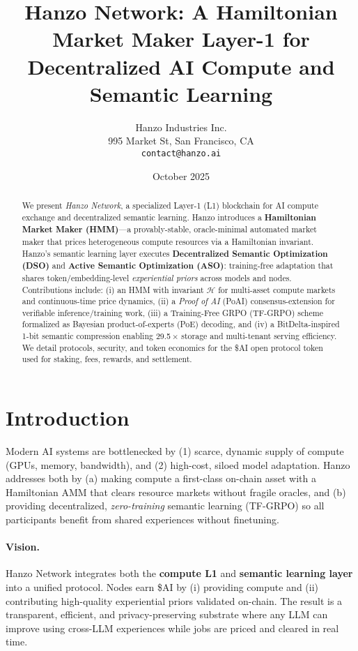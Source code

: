 \documentclass[11pt]{article}
\title{Hanzo Network: A Hamiltonian Market Maker Layer-1 for Decentralized AI Compute and Semantic Learning}
\author{Hanzo Industries Inc. \\ 995 Market St, San Francisco, CA \\ \texttt{contact@hanzo.ai}}
\date{October 2025}
\begin{document}
\maketitle

\begin{abstract}
We present \emph{Hanzo Network}, a specialized Layer-1 (L1) blockchain for AI compute exchange and decentralized semantic learning. Hanzo introduces a \textbf{Hamiltonian Market Maker (HMM)}---a provably-stable, oracle-minimal automated market maker that prices heterogeneous compute resources via a Hamiltonian invariant. Hanzo's semantic learning layer executes \textbf{Decentralized Semantic Optimization (DSO)} and \textbf{Active Semantic Optimization (ASO)}: training-free adaptation that shares token/embedding-level \emph{experiential priors} across models and nodes. Contributions include: (i) an HMM with invariant \(\mathcal H\) for multi-asset compute markets and continuous-time price dynamics, (ii) a \emph{Proof of AI} (PoAI) consensus-extension for verifiable inference/training work, (iii) a Training-Free GRPO (TF-GRPO) scheme formalized as Bayesian product-of-experts (PoE) decoding, and (iv) a BitDelta-inspired 1-bit semantic compression enabling 29.5\,$\times$ storage and multi-tenant serving efficiency. We detail protocols, security, and token economics for the \$AI open protocol token used for staking, fees, rewards, and settlement.
\end{abstract}

\section{Introduction}
Modern AI systems are bottlenecked by (1) scarce, dynamic supply of compute (GPUs, memory, bandwidth), and (2) high-cost, siloed model adaptation. Hanzo addresses both by (a) making compute a first-class on-chain asset with a Hamiltonian AMM that clears resource markets without fragile oracles, and (b) providing decentralized, \emph{zero-training} semantic learning (TF-GRPO) so all participants benefit from shared experiences without finetuning.

\paragraph{Vision.} Hanzo Network integrates both the \textbf{compute L1} and \textbf{semantic learning layer} into a unified protocol. Nodes earn \$AI by (i) providing compute and (ii) contributing high-quality experiential priors validated on-chain. The result is a transparent, efficient, and privacy-preserving substrate where any LLM can improve using cross-LLM experiences while jobs are priced and cleared in real time.
\end{document}
